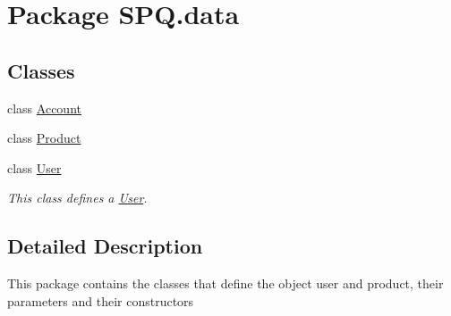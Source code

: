 \hypertarget{namespace_s_p_q_1_1data}{}\section{Package S\+P\+Q.\+data}
\label{namespace_s_p_q_1_1data}
\subsection*{Classes}
\begin{DoxyCompactItemize}
\item 
class \mbox{\hyperlink{class_s_p_q_1_1data_1_1_account}{Account}}
\item 
class \mbox{\hyperlink{class_s_p_q_1_1data_1_1_product}{Product}}
\item 
class \mbox{\hyperlink{class_s_p_q_1_1data_1_1_user}{User}}
\begin{DoxyCompactList}\small\item\em This class defines a \mbox{\hyperlink{class_s_p_q_1_1data_1_1_user}{User}}. \end{DoxyCompactList}\end{DoxyCompactItemize}


\subsection{Detailed Description}
This package contains the classes that define the object user and product, their parameters and their constructors 